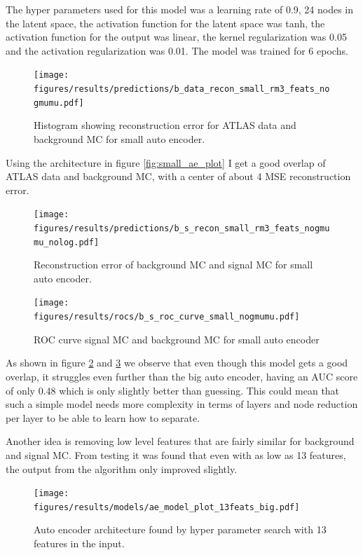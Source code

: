 \documentclass[ reprint, amsmath,amssymb, aps, nofootinbib]{revtex4-2}
\begin{document}
The hyper parameters used for this model was a learning rate of 0.9, 24 nodes in the latent space, the activation function for the latent space was tanh, the activation function for the output was linear, the kernel regularization was 0.05 and the activation regularization was 0.01. The model was trained for 6 epochs.


\begin{figure}[H]
     \centering
         \texttt{[image: figures/results/predictions/b\_data\_recon\_small\_rm3\_feats\_nogmumu.pdf]}
         \caption{Histogram showing reconstruction error for ATLAS data and background MC for small auto encoder. }
     \label{fig:data_b_small_pred}
\end{figure}

Using the architecture in figure \ref{fig:small_ae_plot} I get a good overlap of ATLAS data and background MC, with a center of about 4 MSE reconstruction error. 

\begin{figure}[H]    
 \centering
    \texttt{[image: figures/results/predictions/b\_s\_recon\_small\_rm3\_feats\_nogmumu\_nolog.pdf]}
    \caption{Reconstruction error of background MC and signal MC for small auto encoder. }
    \label{fig:s_b_small_pred_}   
  
\end{figure}

\begin{figure}[H]    
  \centering
         \texttt{[image: figures/results/rocs/b\_s\_roc\_curve\_small\_nogmumu.pdf]}
         \caption{ROC curve signal MC and background MC for small auto encoder}
         \label{fig:s_b_small_roc}  
  
\end{figure}


As shown in figure \ref{fig:s_b_small_pred_} and \ref{fig:s_b_small_roc} we observe that even though this model gets a good overlap, it struggles even further than the big auto encoder, having an AUC score of only 0.48 which is only slightly better than guessing. This could mean that such a simple model needs more complexity in terms of layers and node reduction per layer to be able to learn how to separate.\par 
Another idea is removing low level features that are fairly similar for background and signal MC. From testing it was found that even with as low as 13 features, the output from the algorithm only improved slightly.

\begin{figure}[H]    
  \centering
         \texttt{[image: figures/results/models/ae\_model\_plot\_13feats\_big.pdf]}
         \caption{Auto encoder architecture found by hyper parameter search with 13 features in the input.}
         \label{fig:ae_13feats_big}  
  
\end{figure}
\end{document}
